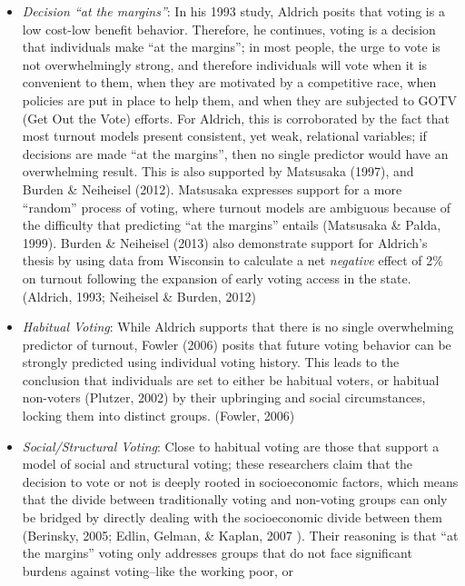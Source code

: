 \documentclass[12pt,twoside]{reedthesis}
\begin{document}
  \begin{itemize}
  \item
    \emph{Decision ``at the margins''}: In his 1993 study, Aldrich posits
    that voting is a low cost-low benefit behavior. Therefore, he
    continues, voting is a decision that individuals make ``at the
    margins''; in most people, the urge to vote is not overwhelmingly
    strong, and therefore individuals will vote when it is convenient to
    them, when they are motivated by a competitive race, when policies are
    put in place to help them, and when they are subjected to GOTV (Get
    Out the Vote) efforts. For Aldrich, this is corroborated by the fact
    that most turnout models present consistent, yet weak, relational
    variables; if decisions are made ``at the margins'', then no single
    predictor would have an overwhelming result. This is also supported by
    Matsusaka (1997), and Burden \& Neiheisel (2012). Matsusaka expresses
    support for a more ``random'' process of voting, where turnout models
    are ambiguous because of the difficulty that predicting ``at the
    margins'' entails (Matsusaka \& Palda, 1999). Burden \& Neiheisel
    (2013) also demonstrate support for Aldrich's thesis by using data
    from Wisconsin to calculate a net \emph{negative} effect of 2\% on
    turnout following the expansion of early voting access in the state.
    (Aldrich, 1993; Neiheisel \& Burden, 2012)
  \item
    \emph{Habitual Voting}: While Aldrich supports that there is no single
    overwhelming predictor of turnout, Fowler (2006) posits that future
    voting behavior can be strongly predicted using individual voting
    history. This leads to the conclusion that individuals are set to
    either be habitual voters, or habitual non-voters (Plutzer, 2002) by
    their upbringing and social circumstances, locking them into distinct
    groups. (Fowler, 2006)
  \item
    \emph{Social/Structural Voting}: Close to habitual voting are those
    that support a model of social and structural voting; these
    researchers claim that the decision to vote or not is deeply rooted in
    socioeconomic factors, which means that the divide between
    traditionally voting and non-voting groups can only be bridged by
    directly dealing with the socioeconomic divide between them (Berinsky,
    2005; Edlin, Gelman, \& Kaplan, 2007 ). Their reasoning is that ``at
    the margins'' voting only addresses groups that do not face
    significant burdens against voting--like the working poor, or

\end{itemize}
\end{document}
